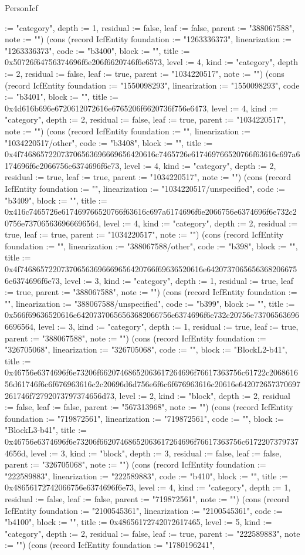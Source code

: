 \begin{lexlean}{PersonIcf}
\begin{semanticmodule}
{:= "category", depth := 1, residual := false, leaf := false, parent := "388067588", note := ""}) (cons (record IcfEntity {foundation := "1263336373", linearization := "1263336373", code := "b3400", block := "", title := 0x50726f64756374696f6e206f6620746f6e6573, level := 4, kind := "category", depth := 2, residual := false, leaf := true, parent := "1034220517", note := ""}) (cons (record IcfEntity {foundation := "1550098293", linearization := "1550098293", code := "b3401", block := "", title := 0x4d616b696e6720612072616e6765206f6620736f756e6473, level := 4, kind := "category", depth := 2, residual := false, leaf := true, parent := "1034220517", note := ""}) (cons (record IcfEntity {foundation := "", linearization := "1034220517/other", code := "b3408", block := "", title := 0x4f746865722073706563696669656420616c7465726e617469766520766f63616c697a6174696f6e2066756e6374696f6e73, level := 4, kind := "category", depth := 2, residual := true, leaf := true, parent := "1034220517", note := ""}) (cons (record IcfEntity {foundation := "", linearization := "1034220517/unspecified", code := "b3409", block := "", title := 0x416c7465726e617469766520766f63616c697a6174696f6e2066756e6374696f6e732c20756e737065636966696564, level := 4, kind := "category", depth := 2, residual := true, leaf := true, parent := "1034220517", note := ""}) (cons (record IcfEntity {foundation := "", linearization := "388067588/other", code := "b398", block := "", title := 0x4f746865722073706563696669656420766f69636520616e64207370656563682066756e6374696f6e73, level := 3, kind := "category", depth := 1, residual := true, leaf := true, parent := "388067588", note := ""}) (cons (record IcfEntity {foundation := "", linearization := "388067588/unspecified", code := "b399", block := "", title := 0x566f69636520616e64207370656563682066756e6374696f6e732c20756e737065636966696564, level := 3, kind := "category", depth := 1, residual := true, leaf := true, parent := "388067588", note := ""}) (cons (record IcfEntity {foundation := "326705068", linearization := "326705068", code := "", block := "BlockL2-b41", title := 0x46756e6374696f6e73206f66207468652063617264696f76617363756c61722c206861656d61746f6c6f676963616c2c20696d6d756e6f6c6f676963616c20616e642072657370697261746f72792073797374656d73, level := 2, kind := "block", depth := 2, residual := false, leaf := false, parent := "567313968", note := ""}) (cons (record IcfEntity {foundation := "719872561", linearization := "719872561", code := "", block := "BlockL3-b41", title := 0x46756e6374696f6e73206f66207468652063617264696f76617363756c61722073797374656d, level := 3, kind := "block", depth := 3, residual := false, leaf := false, parent := "326705068", note := ""}) (cons (record IcfEntity {foundation := "222589883", linearization := "222589883", code := "b410", block := "", title := 0x48656172742066756e6374696f6e73, level := 4, kind := "category", depth := 1, residual := false, leaf := false, parent := "719872561", note := ""}) (cons (record IcfEntity {foundation := "2100545361", linearization := "2100545361", code := "b4100", block := "", title := 0x48656172742072617465, level := 5, kind := "category", depth := 2, residual := false, leaf := true, parent := "222589883", note := ""}) (cons (record IcfEntity {foundation := "1780196241", }
\end{semanticmodule}
\end{lexlean}
